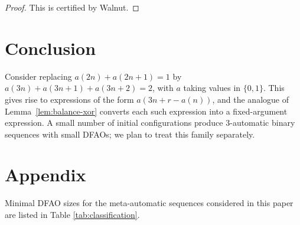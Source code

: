 \documentclass[12pt,reqno]{article}
\theoremstyle{plain}
\theoremstyle{definition}
\theoremstyle{remark}
\begin{document}
\begin{proof}
 This is certified by Walnut. 
 \end{proof}

\section{Conclusion}
 Consider replacing $a(2 n) + a(2 n + 1)=1$ by $a(3n)+a(3n+1)+a(3n+2)=2$, with $a$ taking values in $\{0,1\}$. This gives rise to 
 expressions of the form $a(3n+r-a(n))$, and the analogue of Lemma~\ref{lem:balance-xor} converts each such expression into a 
 fixed-argument expression. A small number of initial configurations produce
 $3$-automatic binary sequences with small DFAOs; we plan to treat this family separately. 

\section{Appendix}\label{Appendix} 
Minimal DFAO sizes for the meta-automatic sequences considered in this paper are 
 listed in Table \ref{tab:classification}. 
\end{document}
